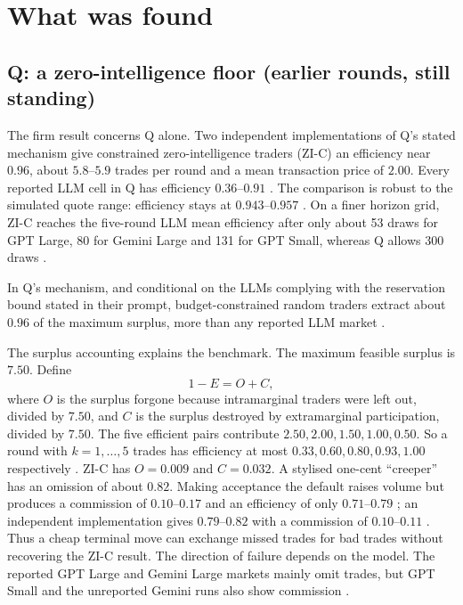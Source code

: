 \documentclass{article}
\begin{document}
\section{What was found}

\subsection{Q: a zero-intelligence floor (earlier rounds, still standing)}
The firm result concerns Q alone. Two independent implementations of Q's stated mechanism give constrained zero-intelligence traders (ZI-C) an efficiency near \(0.96\), about \(5.8\)--\(5.9\) trades per round and a mean transaction price of \(2.00\). Every reported LLM cell in Q has efficiency \(0.36\)--\(0.91\) . The comparison is robust to the simulated quote range: efficiency stays at \(0.943\)--\(0.957\) . On a finer horizon grid, ZI-C reaches the five-round LLM mean efficiency after only about 53 draws for GPT Large, 80 for Gemini Large and 131 for GPT Small, whereas Q allows 300 draws .

\begin{claim}
In Q's mechanism, and conditional on the LLMs complying with the reservation bound stated in their prompt, budget-constrained random traders extract about \(0.96\) of the maximum surplus, more than any reported LLM market .
\end{claim}

The surplus accounting explains the benchmark. The maximum feasible surplus is \(7.50\). Define
\[
  1-E=O+C,
\]
where \(O\) is the surplus forgone because intramarginal traders were left out, divided by \(7.50\), and \(C\) is the surplus destroyed by extramarginal participation, divided by \(7.50\). The five efficient pairs contribute \(2.50, 2.00, 1.50, 1.00, 0.50\). So a round with \(k=1,\ldots,5\) trades has efficiency at most \(0.33, 0.60, 0.80, 0.93, 1.00\) respectively . ZI-C has \(O=0.009\) and \(C=0.032\). A stylised one-cent ``creeper'' has an omission of about \(0.82\). Making acceptance the default raises volume but produces a commission of \(0.10\)--\(0.17\) and an efficiency of only \(0.71\)--\(0.79\) ; an independent implementation gives \(0.79\)--\(0.82\) with a commission of \(0.10\)--\(0.11\) . Thus a cheap terminal move can exchange missed trades for bad trades without recovering the ZI-C result. The direction of failure depends on the model. The reported GPT Large and Gemini Large markets mainly omit trades, but GPT Small and the unreported Gemini runs also show commission .
\end{document}
